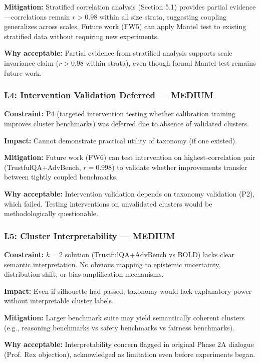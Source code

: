 \textbf{Mitigation:} Stratified correlation analysis (Section 5.1) provides partial evidence---correlations remain $r > 0.98$ within all size strata, suggesting coupling generalizes across scales. Future work (FW5) can apply Mantel test to existing stratified data without requiring new experiments.

\textbf{Why acceptable:} Partial evidence from stratified analysis supports scale invariance claim ($r > 0.98$ within strata), even though formal Mantel test remains future work.

\subsubsection{L4: Intervention Validation Deferred --- MEDIUM}

\textbf{Constraint:} P4 (targeted intervention testing whether calibration training improves cluster benchmarks) was deferred due to absence of validated clusters.

\textbf{Impact:} Cannot demonstrate practical utility of taxonomy (if one existed).

\textbf{Mitigation:} Future work (FW6) can test intervention on highest-correlation pair (TrustfulQA+AdvBench, $r=0.998$) to validate whether improvements transfer between tightly coupled benchmarks.

\textbf{Why acceptable:} Intervention validation depends on taxonomy validation (P2), which failed. Testing interventions on unvalidated clusters would be methodologically questionable.

\subsubsection{L5: Cluster Interpretability --- MEDIUM}

\textbf{Constraint:} $k=2$ solution (TrustfulQA+AdvBench vs BOLD) lacks clear semantic interpretation. No obvious mapping to epistemic uncertainty, distribution shift, or bias amplification mechanisms.

\textbf{Impact:} Even if silhouette had passed, taxonomy would lack explanatory power without interpretable cluster labels.

\textbf{Mitigation:} Larger benchmark suite may yield semantically coherent clusters (e.g., reasoning benchmarks vs safety benchmarks vs fairness benchmarks).

\textbf{Why acceptable:} Interpretability concern flagged in original Phase 2A dialogue (Prof. Rex objection), acknowledged as limitation even before experiments began.

